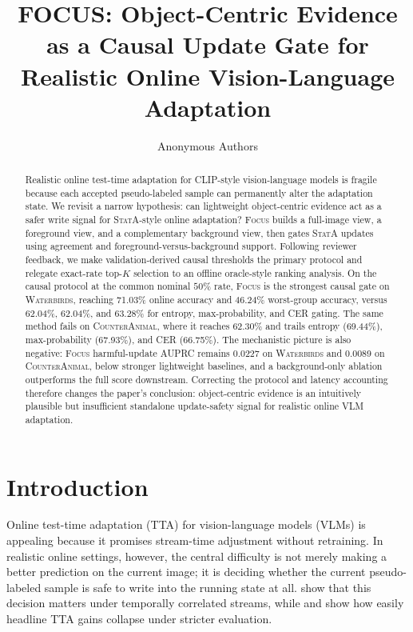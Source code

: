\documentclass{article}
\title{FOCUS: Object-Centric Evidence as a Causal Update Gate for Realistic Online Vision-Language Adaptation}
\author{Anonymous Authors}
\newcommand{\focus}{\textsc{Focus}}
\newcommand{\stata}{\textsc{StatA}}
\newcommand{\wb}{\textsc{Waterbirds}}
\newcommand{\ca}{\textsc{CounterAnimal}}
\begin{document}
\maketitle

\begin{abstract}
Realistic online test-time adaptation for CLIP-style vision-language models is fragile because each accepted pseudo-labeled sample can permanently alter the adaptation state. We revisit a narrow hypothesis: can lightweight object-centric evidence act as a safer write signal for \stata{}-style online adaptation? \focus{} builds a full-image view, a foreground view, and a complementary background view, then gates \stata{} updates using agreement and foreground-versus-background support. Following reviewer feedback, we make validation-derived causal thresholds the primary protocol and relegate exact-rate top-$K$ selection to an offline oracle-style ranking analysis. On the causal protocol at the common nominal $50\%$ rate, \focus{} is the strongest causal gate on \wb{}, reaching 71.03\% online accuracy and 46.24\% worst-group accuracy, versus 62.04\%, 62.04\%, and 63.28\% for entropy, max-probability, and CER gating. The same method fails on \ca{}, where it reaches 62.30\% and trails entropy (69.44\%), max-probability (67.93\%), and CER (66.75\%). The mechanistic picture is also negative: \focus{} harmful-update AUPRC remains 0.0227 on \wb{} and 0.0089 on \ca{}, below stronger lightweight baselines, and a background-only ablation outperforms the full score downstream. Correcting the protocol and latency accounting therefore changes the paper's conclusion: object-centric evidence is an intuitively plausible but insufficient standalone update-safety signal for realistic online VLM adaptation.
\end{abstract}

\section{Introduction}

Online test-time adaptation (TTA) for vision-language models (VLMs) is appealing because it promises stream-time adjustment without retraining. In realistic online settings, however, the central difficulty is not merely making a better prediction on the current image; it is deciding whether the current pseudo-labeled sample is safe to write into the running state at all. \citet{zanella2025realistic} show that this decision matters under temporally correlated streams, while \citet{dobler2024lost} and \citet{sheng2025illusion} show how easily headline TTA gains collapse under stricter evaluation.
\end{document}
